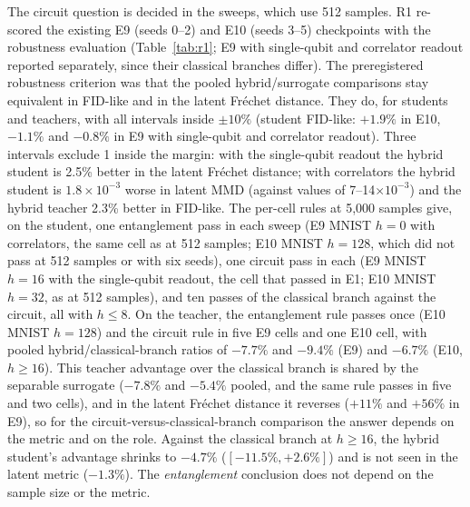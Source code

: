 \documentclass[11pt]{article}
\newcommand{\fidlike}{FID-like}
\begin{document}
The circuit question is decided in the sweeps, which use 512 samples. R1 re-scored
the existing E9 (seeds 0--2) and E10 (seeds 3--5) checkpoints with the robustness
evaluation (Table~\ref{tab:r1}; E9 with single-qubit and correlator readout reported
separately, since their classical branches differ). The preregistered robustness
criterion was that the pooled hybrid/surrogate comparisons stay equivalent in
\fidlike{} and in the latent Fréchet distance. They do, for students and teachers,
with all intervals inside $\pm10\%$ (student \fidlike{}: $+1.9\%$ in E10, $-1.1\%$
and $-0.8\%$ in E9 with single-qubit and correlator readout). Three intervals exclude
1 inside the margin: with the single-qubit readout the hybrid student is 2.5\% better
in the latent Fréchet distance; with correlators the hybrid student is
$1.8\times10^{-3}$ worse in latent MMD (against values of 7--14$\times10^{-3}$) and the
hybrid teacher 2.3\% better in \fidlike{}. The per-cell rules at 5{,}000 samples give, on the student,
one entanglement pass in each sweep (E9 MNIST $h=0$ with correlators, the same cell
as at 512 samples; E10 MNIST $h=128$, which did not pass at 512 samples or with six
seeds), one circuit pass in each (E9 MNIST $h=16$ with the single-qubit readout, the
cell that passed in E1; E10 MNIST $h=32$, as at 512 samples), and ten passes of the
classical branch against the circuit, all with $h\le8$. On the teacher, the
entanglement rule passes once (E10 MNIST $h=128$) and the circuit rule in five E9
cells and one E10 cell, with pooled hybrid/classical-branch ratios of $-7.7\%$ and
$-9.4\%$ (E9) and $-6.7\%$ (E10, $h\ge16$). This teacher advantage over the classical
branch is shared by the separable surrogate ($-7.8\%$ and $-5.4\%$ pooled, and the
same rule passes in five and two cells), and in the latent Fréchet distance it
reverses ($+11\%$ and $+56\%$ in E9), so for the circuit-versus-classical-branch
comparison the answer depends on the metric and on the role. Against the classical
branch at $h\ge16$, the hybrid student's advantage shrinks to $-4.7\%$
($[-11.5\%,+2.6\%]$) and is not seen in the latent metric ($-1.3\%$). The
\emph{entanglement} conclusion does not depend on the sample size or the metric.
\end{document}
